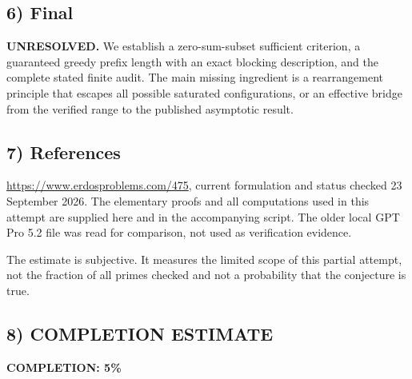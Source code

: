 \subsection*{6) Final}
\textbf{UNRESOLVED.} We establish a zero-sum-subset sufficient criterion, a guaranteed greedy prefix length with an exact blocking description, and the complete stated finite audit. The main missing ingredient is a rearrangement principle that escapes all possible saturated configurations, or an effective bridge from the verified range to the published asymptotic result.

\subsection*{7) References}
\url{https://www.erdosproblems.com/475}, current formulation and status checked 23 September 2026. The elementary proofs and all computations used in this attempt are supplied here and in the accompanying script. The older local GPT Pro 5.2 file was read for comparison, not used as verification evidence.

The estimate is subjective. It measures the limited scope of this partial attempt, not the fraction of all primes checked and not a probability that the conjecture is true.
\subsection*{8) COMPLETION ESTIMATE}
\textbf{COMPLETION: 5\%}
